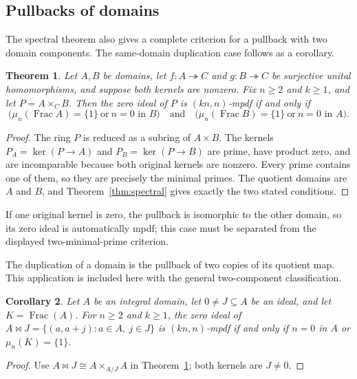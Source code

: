 \documentclass[11pt,a4paper]{amsart}
\newtheorem{theorem}{Theorem}[section]
\newtheorem{corollary}[theorem]{Corollary}
\theoremstyle{definition}
\theoremstyle{remark}
\numberwithin{equation}{section}
\begin{document}
\subsection{Pullbacks of domains}

The spectral theorem also gives a complete criterion for a pullback with
two domain components. The same-domain duplication case follows as a corollary.

\begin{theorem}\label{thm:domain-pullback}
Let $A,B$ be domains, let $f:A\twoheadrightarrow C$ and
$g:B\twoheadrightarrow C$ be surjective unital homomorphisms, and
suppose both kernels are nonzero. Fix $n\ge2$ and $k\ge1$, and let
$P=A\times_C B$.
Then the zero ideal of $P$ is $(kn,n)$-mpdf if and only if
\[
 \bigl(\mu_n(\operatorname{Frac}A)=\{1\}\ \text{or}\ n=0\text{ in }B\bigr)
 \quad\text{and}\quad
 \bigl(\mu_n(\operatorname{Frac}B)=\{1\}\ \text{or}\ n=0\text{ in }A\bigr).
\]
\end{theorem}
\begin{proof}
The ring $P$ is reduced as a subring of $A\times B$.  The kernels
$P_A=\ker(P\to A)$ and $P_B=\ker(P\to B)$ are prime, have product
zero, and are incomparable because both original kernels are
nonzero.  Every prime contains one of them, so they are precisely
the minimal primes.  The quotient domains are $A$ and $B$, and
Theorem~\ref{thm:spectral} gives exactly the two stated conditions.
\end{proof}

If one original kernel is zero, the pullback is isomorphic to the
other domain, so its zero ideal is automatically mpdf; this case
must be separated from the displayed two-minimal-prime criterion.


The duplication of a domain is the pullback of two copies of its
quotient map. This application is included here with the general
two-component classification.

\begin{corollary}\label{cor:domain-duplication}
Let $A$ be an integral domain, let $0\ne J\subseteq A$ be an ideal,
and let $K=\operatorname{Frac}(A)$. For $n\ge2$ and $k\ge1$, the zero
ideal of $A\bowtie J=\{(a,a+j):a\in A,\ j\in J\}$ is
$(kn,n)$-mpdf if and only if $n=0$ in $A$ or $\mu_n(K)=\{1\}$.
\end{corollary}
\begin{proof}
Use $A\bowtie J\cong A\times_{A/J}A$ in
Theorem~\ref{thm:domain-pullback}; both kernels are $J\ne0$.
\end{proof}
\end{document}
